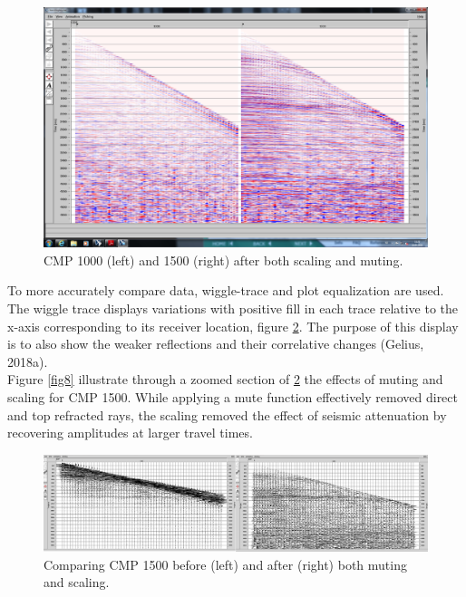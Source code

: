 \documentclass[10pt,a4paper]{article}
\begin{document}
\begin{figure}[H]
\includegraphics[width=\textwidth, trim={1.5cm 1.5cm 1cm 1.5cm},clip]{fig6.jpg}
\caption{CMP 1000 (left) and 1500 (right) after both scaling and muting.}
\label{fig6}
\end{figure}

\noindent To more accurately compare data, wiggle-trace and plot equalization are used. The wiggle trace displays variations with positive fill in each trace relative to the x-axis corresponding to its receiver location, figure \ref{fig7}. 
The purpose of this display is to also show the weaker reflections and their correlative changes (Gelius, 2018a). 
\\
Figure \ref{fig8} illustrate through a zoomed section of \ref{fig7} the effects of muting and scaling for CMP 1500. While applying a mute function effectively removed direct and top refracted rays, the scaling removed the effect of seismic attenuation by recovering amplitudes at larger travel times. 


\begin{figure}[H]
\includegraphics[width=\textwidth]{fig7ekte.jpg}
\caption{Comparing CMP 1500 before (left) and after (right) both muting and scaling.}
\label{fig7}
\end{figure}
\end{document}
